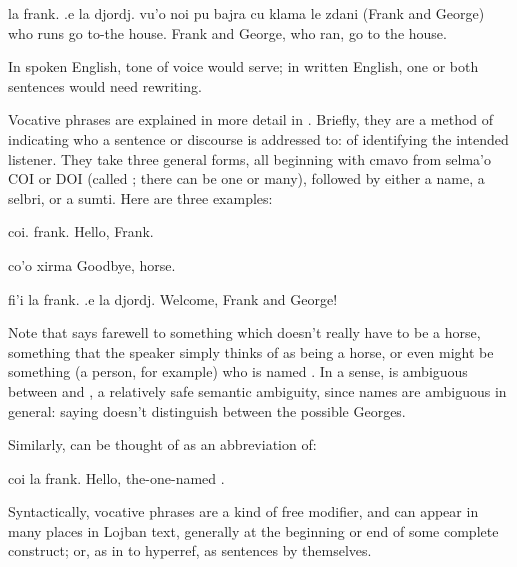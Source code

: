 \begin{example}
la frank. .e la djordj. vu'o noi pu bajra\n
\T	cu klama le zdani\n
(Frank and George) who  runs\n
\T	go to-the house.\n
Frank and George, who ran, go to the house.
\end{example}

In spoken English, tone of voice would serve; in written
    English, one or both sentences would need rewriting.



Vocative phrases are explained in more detail in . Briefly, they are a method of
    indicating who a sentence or discourse is addressed to: of
    identifying the intended listener. They take three general
    forms, all beginning with cmavo from selma'o COI or DOI (called
    ; there can be one or many), followed by
    either a name, a selbri, or a sumti. Here are three
    examples:
\begin{example}
coi. frank.\n
Hello, Frank.
\end{example}

\begin{example}
co'o xirma\n
Goodbye, horse.
\end{example}

\begin{example}
fi'i la frank. .e la djordj.\n
Welcome, Frank and George!
\end{example}

Note that  says farewell to
    something which doesn't really have to be a horse, something
    that the speaker simply thinks of as being a horse, or even
    might be something (a person, for example) who is named
    . In a sense,  is
    ambiguous between  and , a
    relatively safe semantic ambiguity, since names are ambiguous
    in general: saying  doesn't distinguish between the
    possible Georges.

Similarly,  can be thought of
    as an abbreviation of:
\begin{example}
coi la frank.\n
Hello, the-one-named .
\end{example}

Syntactically, vocative phrases are a kind of free modifier,
    and can appear in many places in Lojban text, generally at the
    beginning or end of some complete construct; or, as in  to hyperref, as
    sentences by themselves.

